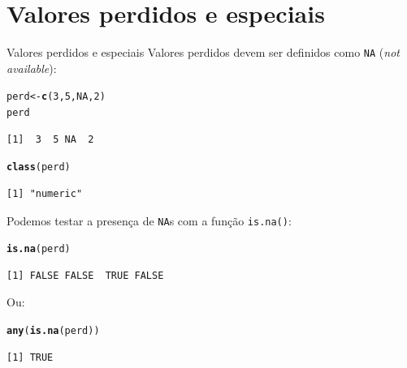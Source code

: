 \documentclass[10pt,handout]{beamer}\usepackage[]{graphicx}\usepackage[]{color}
\makeatletter
\newcommand{\hlnum}[1]{\textcolor[rgb]{0.686,0.059,0.569}{#1}}%
\newcommand{\hlstd}[1]{\textcolor[rgb]{0.345,0.345,0.345}{#1}}%
\newcommand{\hlkwb}[1]{\textcolor[rgb]{0.69,0.353,0.396}{#1}}%
\newcommand{\hlkwd}[1]{\textcolor[rgb]{0.282,0.239,0.545}{\textbf{#1}}}%
\newenvironment{kframe}{%
 \def\at@end@of@kframe{}%
 \ifinner\ifhmode%
  \def\at@end@of@kframe{\end{minipage}}%
  \begin{minipage}{\columnwidth}%
 \fi\fi%
 \def\FrameCommand##1{\hskip\@totalleftmargin \hskip-\fboxsep
 \colorbox{shadecolor}{##1}\hskip-\fboxsep
     \hskip-\linewidth \hskip-\@totalleftmargin \hskip\columnwidth}%
 \MakeFramed {\advance\hsize-\width
   \@totalleftmargin\z@ \linewidth\hsize
   \@setminipage}}%
 {\par\unskip\endMakeFramed%
 \at@end@of@kframe}
\newenvironment{knitrout}{}{} %
\makeatother
\begin{document}
\section[Valores perdidos]{Valores perdidos e especiais}

\begin{frame}[fragile]{Valores perdidos e especiais}
Valores perdidos devem ser definidos como \texttt{NA} (\textit{not available}):
\begin{knitrout}\small
{}\color{fgcolor}\begin{kframe}
\begin{alltt}
\hlstd{perd} \hlkwb{<-} \hlkwd{c}\hlstd{(}\hlnum{3}\hlstd{,} \hlnum{5}\hlstd{,} \hlnum{NA}\hlstd{,} \hlnum{2}\hlstd{)}
\hlstd{perd}
\end{alltt}
\begin{verbatim}
[1]  3  5 NA  2
\end{verbatim}
\begin{alltt}
\hlkwd{class}\hlstd{(perd)}
\end{alltt}
\begin{verbatim}
[1] "numeric"
\end{verbatim}
\end{kframe}
\end{knitrout}

Podemos testar a presença de \texttt{NA}s com a função \texttt{is.na()}:
\begin{knitrout}\small
{}\color{fgcolor}\begin{kframe}
\begin{alltt}
\hlkwd{is.na}\hlstd{(perd)}
\end{alltt}
\begin{verbatim}
[1] FALSE FALSE  TRUE FALSE
\end{verbatim}
\end{kframe}
\end{knitrout}

Ou:
\begin{knitrout}\small
{}\color{fgcolor}\begin{kframe}
\begin{alltt}
\hlkwd{any}\hlstd{(}\hlkwd{is.na}\hlstd{(perd))}
\end{alltt}
\begin{verbatim}
[1] TRUE
\end{verbatim}
\end{kframe}
\end{knitrout}

\end{frame}
\end{document}
